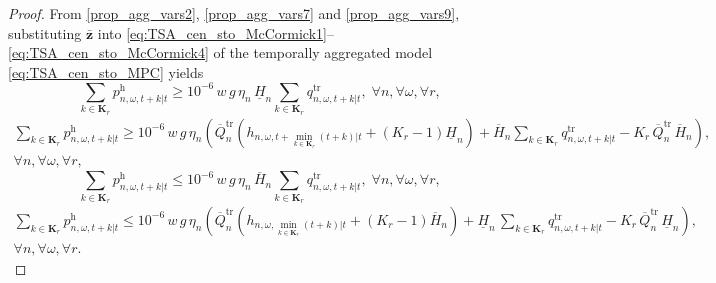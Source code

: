 \documentclass[10pt,a4paper]{amsart}
\begin{document}
\begin{proof}
From \eqref{prop_agg_vars2}, \eqref{prop_agg_vars7} and \eqref{prop_agg_vars9},
substituting $\boldsymbol{\bar{z}}$ into
\eqref{eq:TSA_cen_sto_McCormick1}--\eqref{eq:TSA_cen_sto_McCormick4}
of the temporally aggregated model \eqref{eq:TSA_cen_sto_MPC} yields
\begin{equation}
\sum_{k \in \boldsymbol{K}_r} p^{\mathrm{h}}_{n,\omega,t+k|t}
\geq
10^{-6} \, w \, g \, \eta_n \, \underline{H}_{n} \sum_{k \in \boldsymbol{K}_r} q^{\mathrm{tr}}_{n,\omega,t+k|t},
\; \forall n, \forall \omega, \forall r, 
\label{prop:TSA_cen_sto_McCormick1}
\end{equation}
\begin{multline}
\sum_{k \in \boldsymbol{K}_r} p^{\mathrm{h}}_{n,\omega,t+k|t}
\geq
10^{-6} \, w \, g \, \eta_n \left(
\overline{Q}^{\mathrm{tr}}_{n}
\left(h_{n,\omega,t+\min_{k \in \boldsymbol{K}_r}(t+k)|t} + \left(K_r - 1\right) \underline{H}_n\right)
+ \overline{H}_{n} \sum_{k \in \boldsymbol{K}_r} q^{\mathrm{tr}}_{n, \omega, t+k|t} - K_r \, \overline{Q}^{\mathrm{tr}}_{n}  \, \overline{H}_{n}\right),\\
\forall n, \forall \omega, \forall r, 
\label{prop:TSA_cen_sto_McCormick2}
\end{multline}
\begin{equation}
\sum_{k \in \boldsymbol{K}_r} p^{\mathrm{h}}_{n,\omega,t+k|t}
\leq
10^{-6} \, w \, g \, \eta_n \, \overline{H}_{n} \sum_{k \in \boldsymbol{K}_r} q^{\mathrm{tr}}_{n,\omega,t+k|t},
\; \forall n, \forall \omega, \forall r,
\label{prop:TSA_cen_sto_McCormick3}
\end{equation}
\begin{multline}
\sum_{k \in \boldsymbol{K}_r} p^{\mathrm{h}}_{n,\omega,t+k|t}
\leq
10^{-6} \, w \, g \, \eta_n \left(\overline{Q}^{\mathrm{tr}}_{n}
\left(
h_{n, \omega, \min_{k \in \boldsymbol{K}_r}(t+k)|t} + \left(K_r - 1\right) \overline{H}_n
\right)
+ \underline{H}_{n} \, \sum_{k \in \boldsymbol{K}_r} q^{\mathrm{tr}}_{n, \omega, t+k|t} - K_r \,\overline{Q}^{\mathrm{tr}}_n \, \underline{H}_{n}\right), \\
\forall n, \forall \omega, \forall r.
\label{prop:TSA_cen_sto_McCormick4}
\end{multline}


\end{proof}
\end{document}
